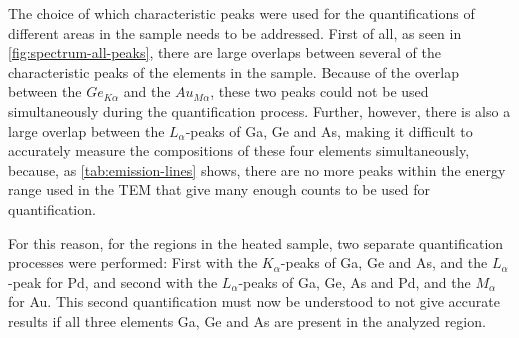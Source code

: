 The choice of which characteristic peaks were used for the quantifications of different areas in the sample needs to be addressed. First of all, as seen in \cref{fig:spectrum-all-peaks}, there are large overlaps between several of the characteristic peaks of the elements in the sample. Because of the overlap between the $Ge_{K\alpha}$ and the $Au_{M\alpha}$, these two peaks could not be used simultaneously during the quantification process. Further, however, there is also a large overlap between the $L_\alpha$-peaks of Ga, Ge and As, making it difficult to accurately measure the compositions of these four elements simultaneously, because, as \cref{tab:emission-lines} shows, there are no more peaks within the energy range used in the TEM that give many enough counts to be used for quantification.

For this reason, for the regions in the heated sample, two separate quantification processes were performed: First with the $K_\alpha$-peaks of Ga, Ge and As, and the $L_\alpha$-peak for Pd, and second with the $L_\alpha$-peaks of Ga, Ge, As and Pd, and the $M_\alpha$ for Au. This second quantification must now be understood to not give accurate results if all three elements Ga, Ge and As are present in the analyzed region.